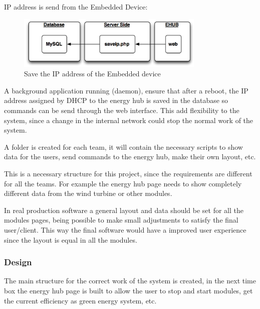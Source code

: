 IP address is send from the Embedded Device:
\begin{figure}[H]
	\begin{centering}
		\includegraphics[width=0.8\textwidth]{images/tb6_webserver_saveip.png}
		\caption{Save the IP address of the Embedded device}
	\end{centering}
\end{figure}
A background application running (daemon), ensure that after a reboot, the IP address assigned by DHCP to the energy hub is saved in the database so commands can be send through the web interface. This add flexibility to the system, since a change in the internal network could stop the normal work of the system.


A folder is created for each team, it will contain the necessary scripts to show data for the users, send commands to the energy hub, make their own layout, etc.

This is a necessary structure for this project, since the requirements are different for all the teams. For example the energy hub page needs to show completely different data from the wind turbine or other modules.

In real production software a general layout and data should be set for all the modules pages, being possible to make small adjustments to satisfy the final user/client. This way the final software would have a improved user experience since the layout is equal in all the modules.

\subsubsection{Design}
%
The main structure for the correct work of the system is created, in the next time box the energy hub page is built to allow the user to stop and start modules, get the current efficiency as green energy system, etc.

